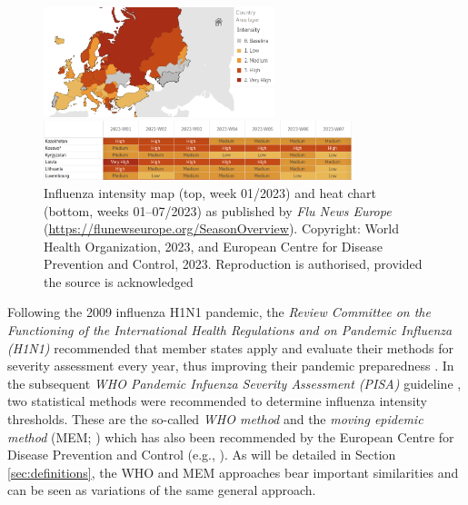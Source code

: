 \documentclass{article}
\begin{document}
\begin{figure}[h!]
\begin{center}
\includegraphics[width=0.6\textwidth]{figure/maps.png}

\medskip

\includegraphics[width=0.8\textwidth]{figure/heat_chart.png}
\end{center}
\caption{Influenza intensity map (top, week 01/2023) and heat chart (bottom, weeks 01--07/2023) as published by \textit{Flu News Europe} (\url{https://flunewseurope.org/SeasonOverview}). Copyright: World Health Organization, 2023, and European Centre for Disease Prevention and Control, 2023.
Reproduction is authorised, provided the source is acknowledged}
\label{fig:maps}
\end{figure}

Following the 2009 influenza H1N1 pandemic, the \textit{Review Committee on the Functioning of the International Health Regulations and on Pandemic Influenza (H1N1)} recommended that member states apply and evaluate their methods for severity assessment every year, thus improving their pandemic preparedness \citep[p.118]{WHO2011}. In the subsequent \textit{WHO Pandemic Infuenza Severity Assessment (PISA)} guideline \citep{WHO2017}, two statistical methods were recommended to determine influenza intensity thresholds. These are the so-called \textit{WHO method} \citep{WHO2014} and the \textit{moving epidemic method} (MEM; \citealt{Vega2015}) which has also been recommended by the European Centre for Disease Prevention and Control (e.g., \citealt{ECDC2017}). As will be detailed in Section \ref{sec:definitions}, the WHO and MEM approaches bear important similarities and can be seen as variations of the same general approach.
\end{document}
